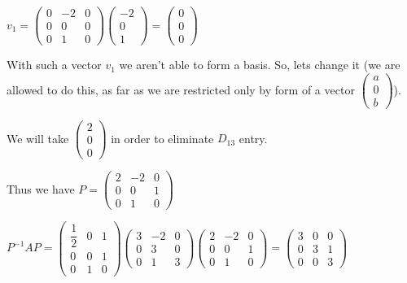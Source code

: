 \documentclass[12pt,letterpaper]{article}
\begin{document}
$v_ 1 = \begin{pmatrix}
            0 & -2 & 0 \\
            0 & 0 & 0 \\
            0 & 1 & 0
        \end{pmatrix}\begin{pmatrix}
            -2 \\
            0 \\
            1
        \end{pmatrix} = \begin{pmatrix}
            0 \\
            0 \\
            0
        \end{pmatrix}$

With such a vector $v_1$ we aren't able to form a basis. So, lets change it (we are allowed to do this, as far as we are restricted only by form of a vector $\begin{pmatrix}
            a \\
            0 \\
            b
        \end{pmatrix}$).
        
We will take $\begin{pmatrix}
            2 \\
            0 \\
            0
        \end{pmatrix}$ in order to eliminate $D_{13}$ entry.
        
Thus we have $P = \begin{pmatrix}
            2 & -2 & 0 \\
            0 & 0 & 1 \\
            0 & 1 & 0
        \end{pmatrix}$
        
$P^{-1}AP = \begin{pmatrix}
            \dfrac{1}{2} & 0 & 1 \\
            0 & 0 & 1 \\
            0 & 1 & 0
        \end{pmatrix}\begin{pmatrix}
            3 & -2 & 0 \\
            0 & 3 & 0 \\
            0 & 1 & 3
        \end{pmatrix}\begin{pmatrix}
            2 & -2 & 0 \\
            0 & 0 & 1 \\
            0 & 1 & 0
        \end{pmatrix} = \begin{pmatrix}
            3 & 0 & 0 \\
            0 & 3 & 1 \\
            0 & 0 & 3
        \end{pmatrix}$
\end{document}
